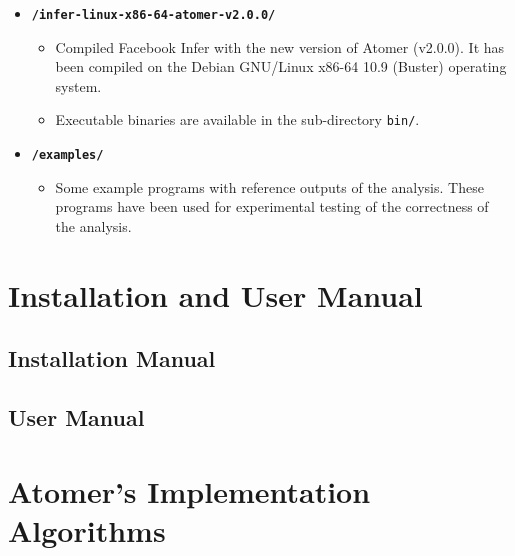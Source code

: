 \begin{itemize}
    \item \texttt{\textbf{/infer-linux-x86-64-atomer-v2.0.0/}}
        \begin{itemize}
            \item Compiled Facebook Infer with the new version of Atomer (v2.0.0). It has been compiled on the Debian GNU/Linux x86-64 10.9 (Buster) operating system.
            
            \item Executable binaries are available in the sub-directory \texttt{bin/}.
        \end{itemize}
    
    \item \texttt{\textbf{/examples/}}
        \begin{itemize}
            \item Some example programs with reference outputs of the analysis. These programs have been used for experimental testing of the correctness of the analysis.
        \end{itemize}
\end{itemize}






\chapter{Installation and User Manual}
\label{app:man}



\section*{Installation Manual}


\section*{User Manual}






\chapter{Atomer's Implementation Algorithms}
\label{app:alg}

